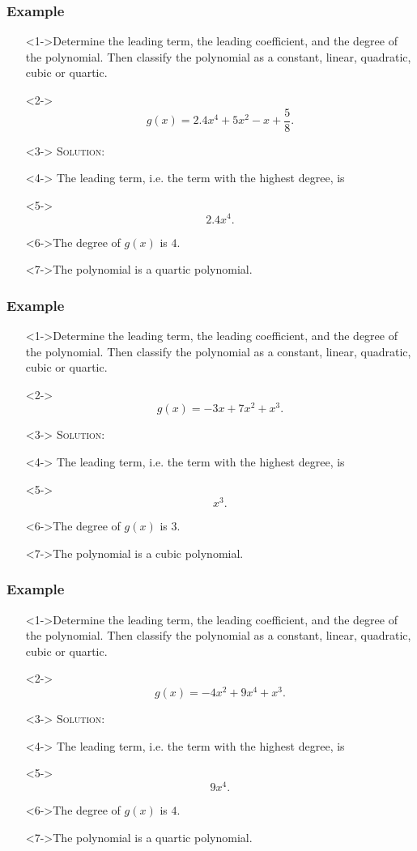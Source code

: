 \documentclass{beamer}
\begin{document}
\begin{frame}
	\frametitle{Example}
	\begin{enumerate}
		\item[]<1->Determine the leading term, the leading coefficient, and the degree of the polynomial.  Then classify the polynomial as a constant, linear, quadratic, cubic or quartic.
		\item[]<2->
		\[
			g(x)=2.4x^{4}+5x^{2}-x+\frac{5}{8}.
		\]
		\item[]<3-> \textsc{Solution:}
		\item[]<4-> The leading term, i.e. the term with the highest degree, is
		\item[]<5-> \[ 2.4x^{4}. \]
		\item[]<6->The degree of $g(x)$ is $4$.
		\item[]<7->The polynomial is a quartic polynomial.
	\end{enumerate}
\end{frame}

\begin{frame}
	\frametitle{Example}
	\begin{enumerate}
		\item[]<1->Determine the leading term, the leading coefficient, and the degree of the polynomial.  Then classify the polynomial as a constant, linear, quadratic, cubic or quartic.
		\item[]<2->
		\[
			g(x)=-3x+7x^{2}+x^{3}.
		\]
		\item[]<3-> \textsc{Solution:}
		\item[]<4-> The leading term, i.e. the term with the highest degree, is
		\item[]<5-> \[ x^{3}. \]
		\item[]<6->The degree of $g(x)$ is $3$.
		\item[]<7->The polynomial is a cubic polynomial.
	\end{enumerate}
\end{frame}

\begin{frame}
	\frametitle{Example}
	\begin{enumerate}
		\item[]<1->Determine the leading term, the leading coefficient, and the degree of the polynomial.  Then classify the polynomial as a constant, linear, quadratic, cubic or quartic.
		\item[]<2->
		\[
			g(x)=-4x^{2}+9x^{4}+x^{3}.
		\]
		\item[]<3-> \textsc{Solution:}
		\item[]<4-> The leading term, i.e. the term with the highest degree, is
		\item[]<5-> \[ 9x^{4}. \]
		\item[]<6->The degree of $g(x)$ is $4$.
		\item[]<7->The polynomial is a quartic polynomial.
	\end{enumerate}
\end{frame}
\end{document}
